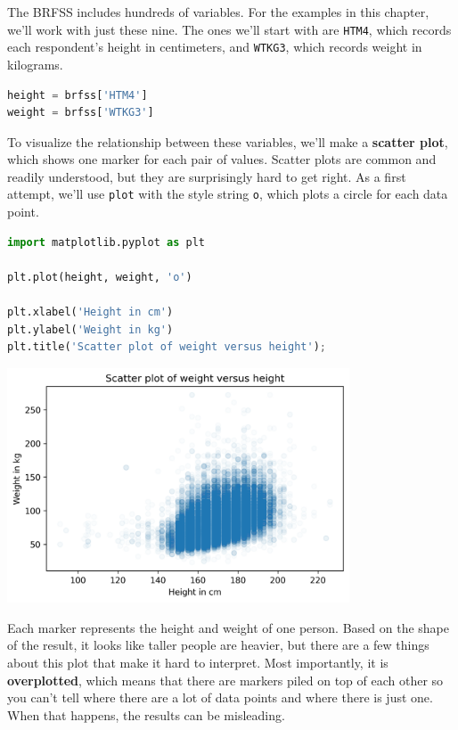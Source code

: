 The BRFSS includes hundreds of variables. For the examples in this
chapter, we'll work with just these nine. The ones we'll start with are
\passthrough{\lstinline!HTM4!}, which records each respondent's height
in centimeters, and \passthrough{\lstinline!WTKG3!}, which records
weight in kilograms.

\begin{lstlisting}[language=Python,style=source]
height = brfss['HTM4']
weight = brfss['WTKG3']
\end{lstlisting}

To visualize the relationship between these variables, we'll make a
\textbf{scatter plot}, which shows one marker for each pair of values.
Scatter plots are common and readily understood, but they are
surprisingly hard to get right. As a first attempt, we'll use
\passthrough{\lstinline!plot!} with the style string
\passthrough{\lstinline!o!}, which plots a circle for each data point.

\begin{lstlisting}[language=Python,style=source]
import matplotlib.pyplot as plt

plt.plot(height, weight, 'o')

plt.xlabel('Height in cm')
plt.ylabel('Weight in kg')
plt.title('Scatter plot of weight versus height');
\end{lstlisting}

\begin{center}
\includegraphics[width=4in]{chapters/09_relationships_files/09_relationships_14_0.png}
\end{center}

Each marker represents the height and weight of one person. Based on the
shape of the result, it looks like taller people are heavier, but there
are a few things about this plot that make it hard to interpret. Most
importantly, it is \textbf{overplotted}, which means that there are
markers piled on top of each other so you can't tell where there are a
lot of data points and where there is just one. When that happens, the
results can be misleading.

